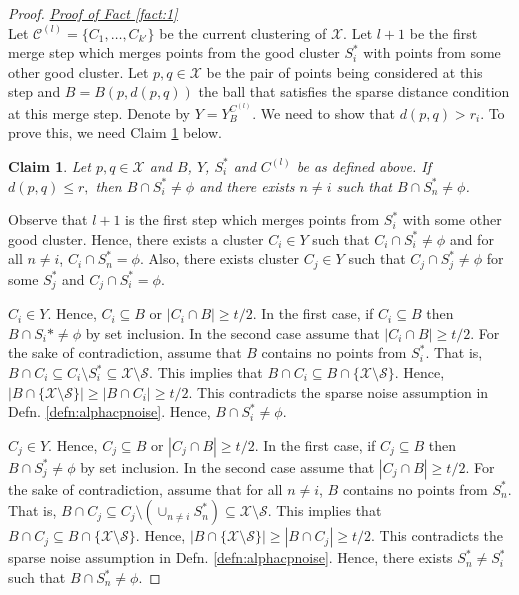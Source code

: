 \documentclass[anon,12pt]{colt2016} %
\newtheorem{claim}[theorem]{Claim}
\newcommand{\mc}{\mathcal}
\begin{document}
\begin{proof}
\noindent\textit{\underline{Proof of Fact \ref{fact:1}}}\\
Let $\mc C^{(l)} = \{C_1, \ldots, C_{k'}\}$ be the current clustering of $\mc X$. Let $l+1$ be the first merge step which merges points from the good cluster $S_i^*$ with points from some other good cluster. Let $p, q \in \mc X$ be the pair of points being considered at this step and $B = B(p, d(p, q))$ the ball that satisfies the sparse distance condition at this merge step. Denote by $Y = Y_{B}^{C^{(l)}}$. We need to show that $d(p, q) > r_i$. To prove this, we need Claim \ref{claim:fromBothCluster} below. 
\begin{claim}
\label{claim:fromBothCluster}
Let $p, q \in \mc X$ and $B$, $Y$, $S_i^*$ and $C^{(l)}$ be as defined above. If $d(p, q) \le r,$ then $B \cap S_i^* \neq \phi$ and there exists $n \neq i$ such that $B \cap S_n^* \neq \phi$.
\end{claim}
\vspace{-0.1in} Observe that $l+1$ is the first step which merges points from $S_i^*$ with some other good cluster. Hence, there exists a cluster $C_i \in Y$ such that $C_i\cap S_i^*  \neq \phi$ and for all $n \neq i$, $C_i \cap S_n^* = \phi$. Also, there exists cluster $C_j \in Y$ such that $C_j \cap S_j^* \neq \phi$ for some $S_j^*$ and $C_j \cap S_i^* = \phi$.

$C_i \in Y$. Hence, $C_i \subseteq B$ or $|C_i \cap B| \ge t/2$. In the first case, if $C_i \subseteq B$ then $B \cap S_i* \neq \phi$ by set inclusion. In the second case assume that $|C_i \cap B| \ge t/2$. For the sake of contradiction, assume that $B$ contains no points from $S_i^*$. That is, $B \cap C_i \subseteq C_i \setminus S_i^* \subseteq \mc X \setminus \mc S$. This implies that $B \cap C_i \subseteq B \cap \{\mc X \setminus \mc S\}$. Hence, $|B\cap \{\mc X \setminus \mc S\}| \ge |B \cap C_i| \ge t/2$. This contradicts the sparse noise assumption in Defn. \ref{defn:alphacpnoise}. Hence, $B \cap S_i^* \neq \phi$.

$C_j \in Y$. Hence, $C_j \subseteq B$ or $|C_j \cap B| \ge t/2$. In the first case, if $C_j \subseteq B$ then $B \cap S_j^* \neq \phi$ by set inclusion. In the second case assume that $|C_j \cap B| \ge t/2$. For the sake of contradiction, assume that for all $n \neq i$, $B$ contains no points from $S_n^*$. That is, $B \cap C_j \subseteq C_j \setminus (\cup_{n \neq i} S_n^*) \subseteq \mc X \setminus \mc S$. This implies that $B \cap C_j \subseteq B \cap \{\mc X \setminus \mc S\}$. Hence, $|B\cap \{\mc X \setminus \mc S\}| \ge |B \cap C_j| \ge t/2$. This contradicts the sparse noise assumption in Defn. \ref{defn:alphacpnoise}. Hence, there exists $S_n^* \neq S_i^*$ such that $B \cap S_n^* \neq \phi$.


\end{proof}
\end{document}
